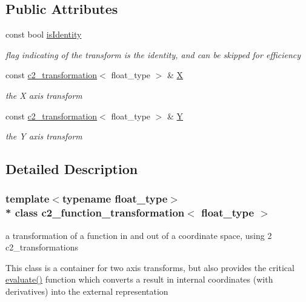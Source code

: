 \subsection*{Public Attributes}
\begin{DoxyCompactItemize}
\item 
const bool \hyperlink{classc2__function__transformation_ad6c579898f034cf8357d773ec87164a4}{is\+Identity}
\begin{DoxyCompactList}\small\item\em flag indicating of the transform is the identity, and can be skipped for efficiency \end{DoxyCompactList}\item 
const \hyperlink{classc2__transformation}{c2\+\_\+transformation}$<$ float\+\_\+type $>$ \& \hyperlink{classc2__function__transformation_a2bd1bd477972e8df3ed0e6d641940e92}{X}
\begin{DoxyCompactList}\small\item\em the X axis transform \end{DoxyCompactList}\item 
const \hyperlink{classc2__transformation}{c2\+\_\+transformation}$<$ float\+\_\+type $>$ \& \hyperlink{classc2__function__transformation_a867523e0adfac76943984aa5a26d4274}{Y}
\begin{DoxyCompactList}\small\item\em the Y axis transform \end{DoxyCompactList}\end{DoxyCompactItemize}


\subsection{Detailed Description}
\subsubsection*{template$<$typename float\+\_\+type$>$\\*
class c2\+\_\+function\+\_\+transformation$<$ float\+\_\+type $>$}

a transformation of a function in and out of a coordinate space, using 2 c2\+\_\+transformations 

This class is a container for two axis transforms, but also provides the critical \hyperlink{classc2__function__transformation_a7089747852a044a4a6a9884fadecf871}{evaluate()} function which converts a result in internal coordinates (with derivatives) into the external representation 

